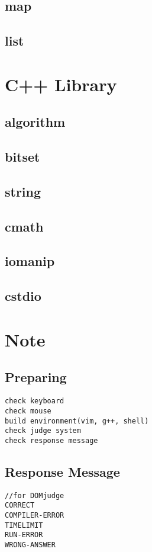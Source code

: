 \documentclass[a4paper, landscape, 8pt]{article}
\begin{document}
\begin{multicols*}{3}
\subsection{map}

\subsection{list}


\section{C++ Library}
\subsection{algorithm}

\subsection{bitset}

\subsection{string}

\subsection{cmath}

\subsection{iomanip}

\subsection{cstdio}


\section{Note}
\subsection{Preparing}
\begin{lstlisting}[]
check keyboard
check mouse
build environment(vim, g++, shell)
check judge system
check response message
\end{lstlisting}
\subsection{Response Message}
\begin{lstlisting}[]
//for DOMjudge
CORRECT
COMPILER-ERROR
TIMELIMIT
RUN-ERROR
WRONG-ANSWER
\end{lstlisting}

\end{multicols*}
\end{document}
